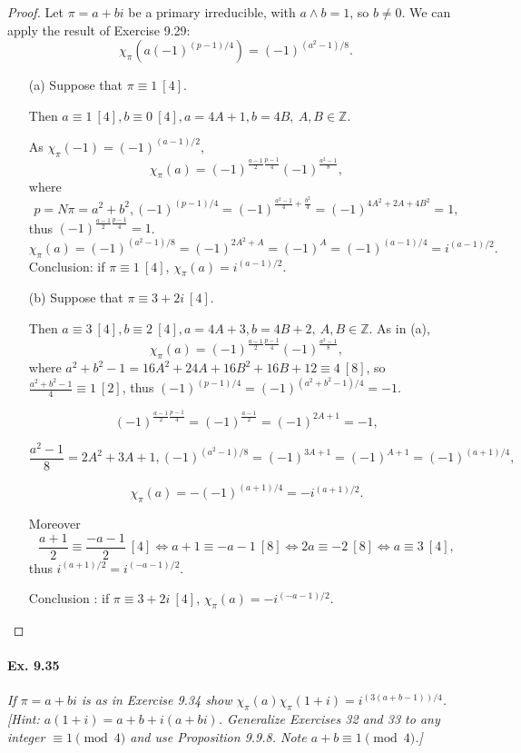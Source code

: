 \documentclass[11pt,a4paper]{article}
\begin{document}
\begin{proof}
Let $\pi = a+bi$ be a primary irreducible, with $a\wedge b=1$, so $b \neq 0$. We can apply the result of Exercise 9.29:
$$\chi_\pi(a(-1)^{(p-1)/4}) = (-1)^{(a^2-1)/8}.$$
\begin{enumerate}
\item[(a)] Suppose that  $\pi \equiv 1 \ [4]$. 

Then $a\equiv 1\ [4], b\equiv 0 \ [4], a = 4A+1,b=4B,\ A,B \in \mathbb{Z}$.

As $\chi_\pi(-1) = (-1)^{(a-1)/2}$, 
$$\chi_\pi(a) = (-1)^{\frac{a-1}{2} \frac{p-1}{4}}(-1)^{\frac{a^2-1}{8}},$$
where 
$$ p = N \pi = a^2+b^2, (-1)^{(p-1)/4} = (-1)^{\frac{a^2-1}{4}+\frac{b^2}{4}} = (-1)^{4A^2+2A+4B^2}=1,$$
thus $(-1)^{\frac{a-1}{2} \frac{p-1}{4}}=1$.
$$\chi_\pi(a) = (-1)^{(a^2-1)/8} = (-1)^{2A^2+A} = (-1)^A = (-1)^{(a-1)/4} = i^{(a-1)/2}.$$
Conclusion: if $\pi \equiv 1 \ [4]$, $\chi_\pi(a) =  i^{(a-1)/2}$.
\item[(b)] Suppose that $\pi \equiv 3 + 2i\ [4]$.

Then $a\equiv 3 \ [4], b \equiv 2\ [4],a = 4A+3,b=4B+2,\ A,B\in\mathbb{Z}$. As in (a),
$$\chi_\pi(a) = (-1)^{\frac{a-1}{2} \frac{p-1}{4}}(-1)^{\frac{a^2-1}{8}},$$
where $a^2+b^2-1 = 16 A^2+24A+16B^2+16B+12 \equiv 4 \ [8]$, so $\frac{a^2+b^2-1}{4} \equiv 1 \ [2]$, thus $(-1)^{(p-1)/4} = (-1)^{(a^2+b^2-1)/4} = -1$.

$$ (-1)^{\frac{a-1}{2} \frac{p-1}{4}} = (-1)^{\frac{a-1}{2}} = (-1)^{2A+1} = -1,$$

$$\frac{a^2-1}{8} = 2A^2+3A+1, (-1)^{(a^2-1)/8} = (-1)^{3A+1} = (-1)^{A+1}=(-1)^{(a+1)/4},$$

$$\chi_\pi(a)= -(-1)^{(a+1)/4} = -i^{(a+1)/2}.$$

Moreover $$\frac{a+1}{2} \equiv \frac{-a-1}{2} \ [4] \iff a+1 \equiv -a-1\ [8] \iff 2a\equiv -2 \ [8] \iff a\equiv 3 \ [4],$$ thus $i^{(a+1)/2} = i ^{(-a-1)/2}$.

Conclusion : if $\pi \equiv 3+2i \ [4]$, $\chi_\pi(a) = - i^{(-a-1)/2}$.

\end{enumerate}
\end{proof}

\paragraph{Ex. 9.35}

{\it If $\pi = a+bi$ is as in Exercise 9.34 show $\chi_\pi(a)\chi_\pi(1+i) = i ^{(3(a+b-1))/4}$. [Hint: $a(1+i) = a+b +i(a+bi)$. Generalize Exercises 32 and 33 to any integer $\equiv 1 \pmod 4$ and use Proposition 9.9.8. Note $a+b \equiv 1 \pmod 4$.]
}
\end{document}
